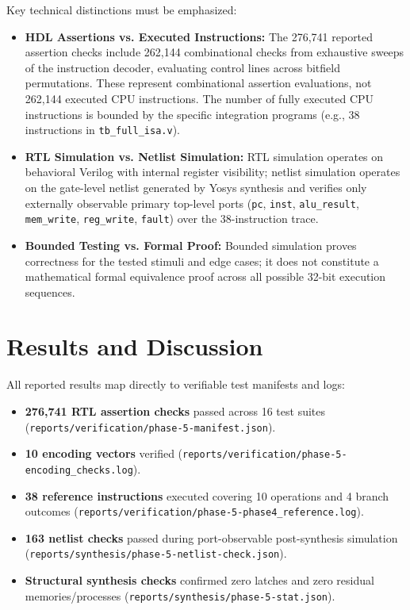 \documentclass[conference]{IEEEtran}
\begin{document}
Key technical distinctions must be emphasized:
\begin{itemize}
\item \textbf{HDL Assertions vs. Executed Instructions:} The 276,741 reported assertion checks include 262,144 combinational checks from exhaustive sweeps of the instruction decoder, evaluating control lines across bitfield permutations. These represent combinational assertion evaluations, not 262,144 executed CPU instructions. The number of fully executed CPU instructions is bounded by the specific integration programs (e.g., 38 instructions in \texttt{tb\_full\_isa.v}).
\item \textbf{RTL Simulation vs. Netlist Simulation:} RTL simulation operates on behavioral Verilog with internal register visibility; netlist simulation operates on the gate-level netlist generated by Yosys synthesis and verifies only externally observable primary top-level ports (\texttt{pc}, \texttt{inst}, \texttt{alu\_result}, \texttt{mem\_write}, \texttt{reg\_write}, \texttt{fault}) over the 38-instruction trace.
\item \textbf{Bounded Testing vs. Formal Proof:} Bounded simulation proves correctness for the tested stimuli and edge cases; it does not constitute a mathematical formal equivalence proof across all possible 32-bit execution sequences.
\end{itemize}

\section{Results and Discussion}
All reported results map directly to verifiable test manifests and logs:
\begin{itemize}
\item \textbf{276,741 RTL assertion checks} passed across 16 test suites (\texttt{reports/verification/phase-5-manifest.json}).
\item \textbf{10 encoding vectors} verified (\texttt{reports/verification/phase-5-encoding\_checks.log}).
\item \textbf{38 reference instructions} executed covering 10 operations and 4 branch outcomes (\texttt{reports/verification/phase-5-phase4\_reference.log}).
\item \textbf{163 netlist checks} passed during port-observable post-synthesis simulation (\texttt{reports/synthesis/phase-5-netlist-check.json}).
\item \textbf{Structural synthesis checks} confirmed zero latches and zero residual memories/processes (\texttt{reports/synthesis/phase-5-stat.json}).
\end{itemize}
\end{document}

